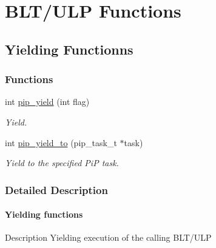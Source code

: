 \documentclass[twoside]{book}
\begin{document}
\chapter{BLT/ULP Functions}
\hypertarget{group__ulp-0-yield}{\section{Yielding Functionns}
\label{group__ulp-0-yield}
}
\subsection*{Functions}
\begin{DoxyCompactItemize}
\item 
int \hyperlink{group__ulp-0-yield_ga50469f21446ce86ea18ddd282cf15894}{pip\-\_\-yield} (int flag)
\begin{DoxyCompactList}\small\item\em Yield. \end{DoxyCompactList}\item 
int \hyperlink{group__ulp-0-yield_gac30cf124b28a8d80dac34c5e1bdb66ba}{pip\-\_\-yield\-\_\-to} (pip\-\_\-task\-\_\-t $\ast$task)
\begin{DoxyCompactList}\small\item\em Yield to the specified Pi\-P task. \end{DoxyCompactList}\end{DoxyCompactItemize}


\subsection{Detailed Description}
\hypertarget{pip-yield}{}\subsubsection{Yielding functions}\label{pip-yield}
\begin{DoxyParagraph}{Description}
Yielding execution of the calling B\-L\-T/\-U\-L\-P 
\end{DoxyParagraph}
\end{document}
